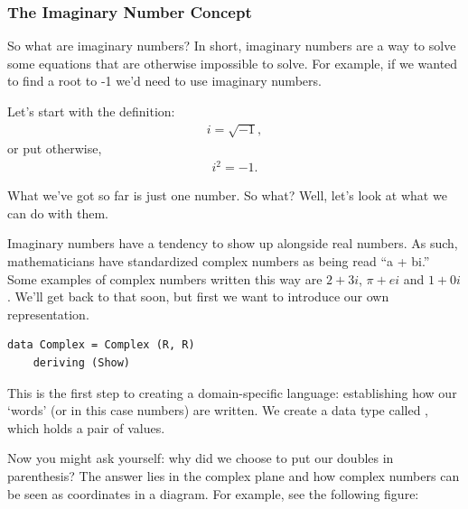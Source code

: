 \subsubsection{The Imaginary Number Concept}
So what are imaginary numbers? 
In short, imaginary numbers are a way to solve some equations that are otherwise impossible to solve. For example, if we wanted to find a root to -1 we'd need to use imaginary numbers. 


Let's start with the definition:
\begin{align*}
    i = \sqrt{-1},
\end{align*}
or put otherwise, 
\begin{align*}
    i^2 = -1.
\end{align*}

What we've got so far is just one number. So what? Well, let's look at what we can do with them. 

Imaginary numbers have a tendency to show up alongside real numbers. As such, mathematicians have standardized complex numbers as being read ``a + bi.'' Some examples of complex numbers written this way are $2+3i$, $\pi + ei$ and $1+0i$. 
We'll get back to that soon, but first we want to introduce our own representation. 

\begin{verbatim}
data Complex = Complex (R, R)
    deriving (Show)
\end{verbatim}

This is the first step to creating a domain-specific language: establishing how our `words' (or in this case numbers) are written. We create a data type called , which holds a pair of values. 

Now you might ask yourself: why did we choose to put our doubles in parenthesis? The answer lies in the complex plane and how complex numbers can be seen as coordinates in a diagram. For example, see the following figure:

